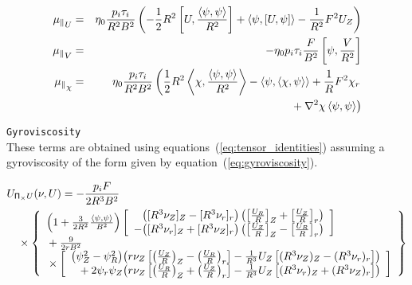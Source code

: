 \begin{eqnarray*}
  {\mu_\parallel}_U & = & \eta_0 \frac{p_i \tau_i}{R^2 B^2} \left( 
  - \frac{1}{2} R^2 \left[U,\frac{\left\langle \psi,\psi\right\rangle}{R^2}\right]
  + \left\langle \psi,\left[U,\psi\right]\right\rangle
  - \frac{1}{R^2} F^2 U_Z \right)
  \\
  {\mu_\parallel}_V & = & -\eta_0 p_i \tau_i \frac{F}{B^2} 
  \left[\psi,\frac{V}{R^2}\right]
  \\
  {\mu_\parallel}_\chi & = & \eta_0 \frac{p_i \tau_i}{R^2 B^2} \left(
    \frac{1}{2} R^2 \left\langle \chi,\frac{\left\langle \psi,\psi\right\rangle}{R^2}\right\rangle
  - \left\langle \psi,\left\langle \chi,\psi\right\rangle\right\rangle
  + \frac{1}{R} F^2 \chi_r 
  \right.\\ && \left. \mbox{}
  + \nabla^2 \chi \left\langle \psi,\psi\right\rangle
  \right)
\end{eqnarray*}


\texttt{Gyroviscosity}
\\
These terms are obtained using equations~(\ref{eq:tensor_identities})
assuming a gyroviscosity of the form given by
equation~(\ref{eq:gyroviscosity}).

\begin{eqnarray*}
  & \lefteqn{U_{\P_\times U}(\nu, U) = -\frac{p_i F}{2 R^3 B^2}} & 
  \\ & & \mbox{} \times
    \left\{ \begin{array}{l} 
      \left(1+\frac{3}{2 R^2}\frac{\ip{\psi}{\psi}}{B^2}\right)
      \left[ \begin{array}{r@{}l}
	     & \left( [R^3 \nu_Z]_Z - [R^3 \nu_r]_r \right)
	       \left( \left[\frac{U_R}{R}\right]_Z 
	            + \left[\frac{U_Z}{R}\right]_r \right) 
             \\ \mbox{}
	   - & \left( [R^3 \nu_r]_Z + [R^3 \nu_Z]_r \right)
	       \left( \left[\frac{U_Z}{R}\right]_Z 
	            - \left[\frac{U_R}{R}\right]_r \right) 
	     \end{array} \right]
       \\ \mbox{}
      + \frac{9}{2 r B^2} 
      \\ \mbox{} \times \left[ 
	\begin{array}{r@{}l}
	  \left( \psi_Z^2 - \psi_R^2 \right) &
	  \left( r \nu_Z \left[ 
	    \left( \frac{U_Z}{R} \right)_Z -
	    \left( \frac{U_R}{R} \right)_r \right]
          -\frac{1}{R^3} U_Z \left[ 
	    (R^3 \nu_Z)_Z - (R^3 \nu_r)_r \right] \right)
	  \\ 
	  \mbox{} + 2 \psi_r \psi_Z &
          \left( r \nu_Z \left[ 
	    \left( \frac{U_R}{R} \right)_Z +
	    \left( \frac{U_Z}{R} \right)_r \right]
          -\frac{1}{R^3} U_Z \left[ 
	    (R^3 \nu_r)_Z + (R^3 \nu_Z)_r \right] \right)
	  \end{array} \right] 
    \end{array} \right\}
\end{eqnarray*}

